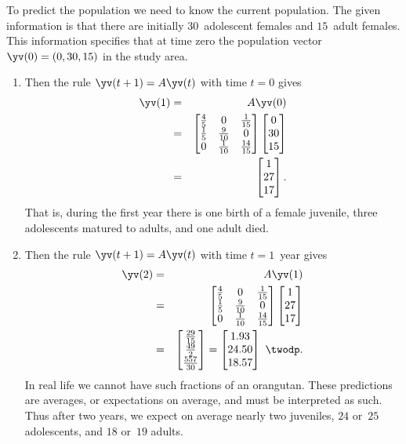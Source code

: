 \begin{example}[orangutans]
\begin{solution}
To predict the population we need to know the current population.
The given information is that there are initially \(30\)~adolescent females and \(15\)~adult females. 
This information specifies that at time zero the population vector \(\yv(0)=(0,30,15)\) in the study area.
\begin{enumerate}
\item Then the rule \(\yv(t+1)=A\yv(t)\) with time \(t=0\) gives
\begin{eqnarray*}
\yv(1)&=&A\yv(0)
\\&=&\begin{bmatrix} \frac45&0&\frac1{15}
\\\frac15&\frac9{10}&0
\\0&\frac1{10}&\frac{14}{15} \end{bmatrix}\begin{bmatrix} 0\\30\\15 \end{bmatrix}
\\&=&\begin{bmatrix} 1\\27\\17 \end{bmatrix}.
\end{eqnarray*}
That is, during the first year there is one birth of a female juvenile, three adolescents matured to adults, and one adult died. 

\item Then the rule \(\yv(t+1)=A\yv(t)\) with time \(t=1\)~year gives
\begin{eqnarray*}
\yv(2)&=&A\yv(1)
\\&=&\begin{bmatrix} \frac45&0&\frac1{15}
\\\frac15&\frac9{10}&0
\\0&\frac1{10}&\frac{14}{15} \end{bmatrix}\begin{bmatrix} 1\\27\\17 \end{bmatrix}
\\&=&\begin{bmatrix} \frac{29}{15}\\\frac{49}2\\\frac{557}{30} \end{bmatrix}=\begin{bmatrix} 1.93\\24.50\\18.57 \end{bmatrix}\ \twodp.
\end{eqnarray*}
In real life we cannot have such fractions of an orangutan.
These predictions are averages, or expectations on average, and must be interpreted as such. 
Thus after two years, we expect on average nearly two juveniles, \(24\) or~\(25\) adolescents, and \(18\) or~\(19\) adults.


\end{enumerate}
\end{solution}
\end{example}
